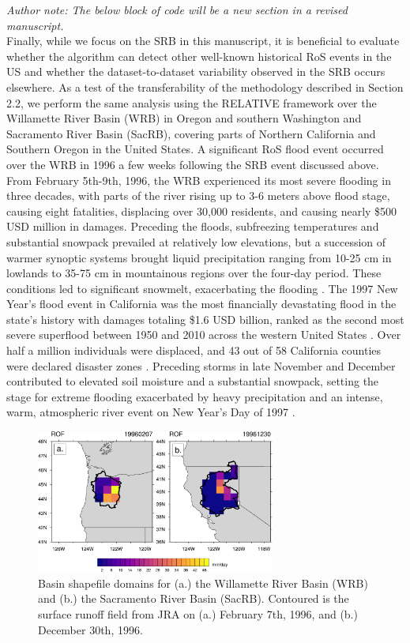 \documentclass{article}
\begin{document}
\textit{Author note: The below block of code will be a new section in a revised manuscript.}\\

Finally, while we focus on the SRB in this manuscript, it is beneficial to evaluate whether the algorithm can detect other well-known historical RoS events in the US and whether the dataset-to-dataset variability observed in the SRB occurs elsewhere.
As a test of the transferability of the methodology described in Section 2.2, we perform the same analysis using the RELATIVE framework over the Willamette River Basin (WRB) in Oregon and southern Washington and Sacramento River Basin (SacRB), covering parts of Northern California and Southern Oregon in the United States.
A significant RoS flood event occurred over the WRB in 1996 a few weeks following the SRB event discussed above.
From February 5th-9th, 1996, the WRB experienced its most severe flooding in three decades, with parts of the river rising up to 3-6 meters above flood stage, causing eight fatalities, displacing over 30,000 residents, and causing nearly \$500 USD million in damages.
Preceding the floods, subfreezing temperatures and substantial snowpack prevailed at relatively low elevations, but a succession of warmer synoptic systems brought liquid precipitation ranging from 10-25 cm in lowlands to 35-75 cm in mountainous regions over the four-day period.
These conditions led to significant snowmelt, exacerbating the flooding \citep{halpert1997climate,colle2000february}.
The 1997 New Year's flood event in California was the most financially devastating flood in the state's history with damages totaling \$1.6 USD billion, ranked as the second most severe superflood between 1950 and 2010 across the western United States \citep{tarouilly2021western}.
Over half a million individuals were displaced, and 43 out of 58 California counties were declared disaster zones \citep{lott1997}.
Preceding storms in late November and December contributed to elevated soil moisture and a substantial snowpack, setting the stage for extreme flooding exacerbated by heavy precipitation and an intense, warm, atmospheric river event on New Year's Day of 1997 \citep{galewsky2005moist,rhoades2023recreating}.

\begin{figure}[H]
\noindent\includegraphics[width=0.7\textwidth]{figs/cropped/other_basins_ROF.pdf}
\caption{Basin shapefile domains for (a.) the Willamette River Basin (WRB) and (b.) the Sacramento River Basin (SacRB). Contoured is the surface runoff field from JRA on (a.) February 7th, 1996, and (b.) December 30th, 1996.}
\label{fig:otherbasins}
\end{figure}
\end{document}
